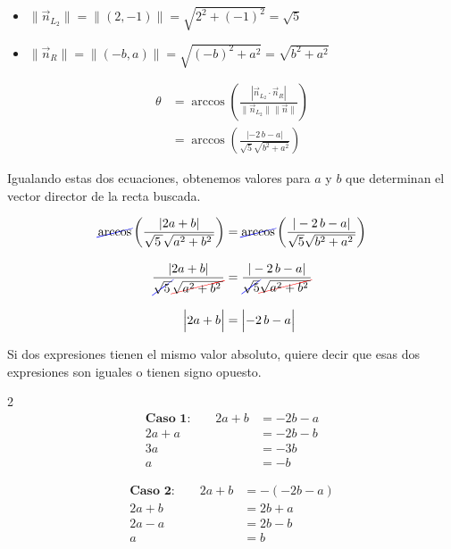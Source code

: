 \documentclass[11pt]{article}
\newcommand{\Cancelar}[2][black]{{\color{#1}\cancel{\color{black}#2}}}%
\begin{document}
\begin{enumerate}[\hspace{-5mm} 1) ]
\begin{enumerate}[(a)]
\begin{minipage}{.53\textwidth}
\begin{itemize}
    \item $\|\vec{n}_{L_2}\|= \| (2,-1) \| = \sqrt{2^2 + (-1)^2} = \sqrt{5} $

    \item $\|\vec{n}_{R}\|= \| (-b,a) \| = \sqrt{(-b)^2 + a^2} = \sqrt{b^2+a^2} $

    
\end{itemize}
\begin{align*}
    \theta &= \arccos\left( \frac{|\vec{n}_{L_2} \cdot \vec{n}_R|}{\|\vec{n}_{L_2}\| \|\vec{n}\|} \right)
    \\[2mm]
    &= \arccos\left( \frac{|-2 \, b -a|}{\sqrt{5} \sqrt{b^2 + a^2}}  \right)
\end{align*}


\end{minipage}




Igualando estas dos ecuaciones, obtenemos valores para $a$ y $b$ que determinan el vector director de la recta buscada.

\begin{align*}
    \Cancelar[blue]{\arccos }\left( \frac{|2a + b|}{\sqrt{5\,} \sqrt{a^2 + b^2\,}}  \right) 
    &=
   \Cancelar[blue]{ \arccos }\left( \frac{|-2 \, b - a|}{\sqrt{5} \sqrt{b^2 + a^2\,}}  \right)
    \\[3mm]
      \frac{|2a + b|}{\Cancelar[blue]{\sqrt{5\,}}\Cancelar[red]{\sqrt{a^2 + b^2\,}}}
    &=
    \frac{|-2\, b - a|}{\Cancelar[blue]{\sqrt{5}}\Cancelar[red]{ \sqrt{a^2 + b^2\,}}}
    \\[3mm]
       \left|2a + b \rule{0mm}{4mm} \right|    
    &=
      \left|    -2 \, b - a  \rule{0mm}{4mm} \right|
\end{align*}

Si dos expresiones tienen el mismo valor absoluto, quiere decir que esas dos expresiones son iguales o tienen signo opuesto.
%
%

\vspace{-9mm}\begin{multicols}{2}  
\begin{align*}
\textbf{Caso 1:}\qquad   2 a + b &= -2b - a  
  \\[3mm]
   2a +a   &= -2b -  b
   \\[3mm]
   3a &= -3 b
   \\[3mm]
   a &= -b
\end{align*} 
  
 \columnbreak %

\begin{align*}
\textbf{Caso 2:}\qquad    2a + b &= -(-2b - a ) 
  \\[3mm]
  2a + b &= 2b  + a 
  \\[3mm]
   2a - a   &= 2b -  b
   \\[3mm]   
   a &= b
\end{align*}


\end{multicols}
\end{enumerate}
\end{enumerate}
\end{document}
